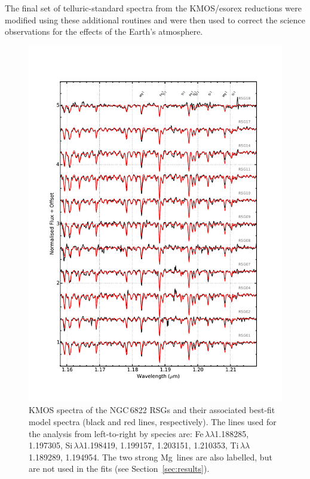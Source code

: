 The final set of telluric-standard spectra from the KMOS/esorex reductions were modified using these additional routines and were then used to correct the science observations for the effects of the Earth's atmosphere.



\begin{figure}
 \centering
 \begin{center}
\includegraphics[width=\textwidth]{ngc6822/N6822_mod_fit.pdf}
\caption[Observed and best-fit model spectra]{
KMOS spectra of the NGC\,6822 RSGs and their associated best-fit model spectra
(black and red lines, respectively).
The lines used for the analysis from left-to-right by species are:
Fe\,\1$\lambda\lambda$1.188285,
1.197305,
Si\,\1$\lambda\lambda$1.198419,
1.199157,
1.203151,
1.210353,
Ti\,\1$\lambda\lambda$1.189289,
1.194954.
The two strong Mg\,\1 lines are also labelled, but are not used in the fits
(see Section~\ref{sec:results}).
         }
\label{fig:model_fits}
\end{center}
\end{figure}


